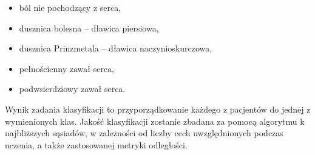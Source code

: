 \documentclass[runningheads]{llncs}
\begin{document}
\begin{itemize}
\item ból nie pochodzący z serca,
\item dusznica bolesna – dławica piersiowa,
\item dusznica Prinzmetala – dławica naczynioskurczowa,
\item pełnościenny zawał serca,
\item podwsierdziowy zawał serca.
\end{itemize}

Wynik zadania klasyfikacji to przyporządkowanie każdego z pacjentów do jednej z wymienionych klas. Jakość klasyfikacji zostanie zbadana za pomocą algorytmu k najbliższych sąsiadów, w zależności od liczby cech uwzględnionych podczas uczenia, a także zastosowanej metryki odległości.
\end{document}
